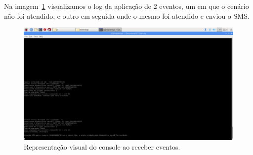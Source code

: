 Na imagem~\ref{fig:eventoConsole} visualizamos o log da aplicação de 2 eventos, um em que o cenário não foi atendido, e outro em seguida onde o mesmo foi atendido e enviou o SMS.
\begin{figure}[h!]
	\begin{center}
		\includegraphics[width=1.085\textwidth]{./img/eventoAtendidoNaoAtendidoConsole}
		\caption{Representação visual do console ao receber eventos.}
		\label{fig:eventoConsole}
	\end{center}
\end{figure}

